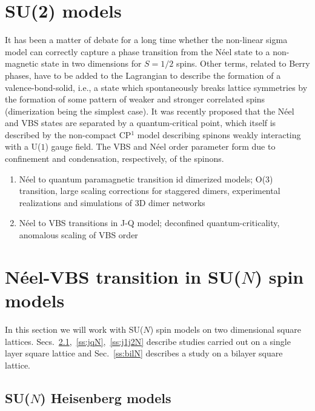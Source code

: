 \documentclass[aps,prb,groupedaddress,twocolumn]{revtex4}
\begin{document}
\section{SU(2) models}

It has been a matter of debate for a long time whether the non-linear sigma model can correctly capture a 
phase transition from the N\'eel state to a non-magnetic
state in two dimensions for $S=1/2$ spins. Other terms, related to Berry phases, have to be added to the Lagrangian
to describe the formation of a valence-bond-solid, i.e., a state which spontaneously breaks lattice symmetries 
by the formation of some pattern of weaker and stronger correlated spins (dimerization being the simplest case).
It was recently proposed that the N\'eel and VBS states are separated by a quantum-critical point, which itself
is described by the non-compact CP$^1$ model describing spinons weakly interacting with a U($1$) gauge field.
The VBS and N\'eel order parameter form due to confinement and condensation, respectively, of the spinons.


\begin{enumerate}
\item N\'eel to quantum paramagnetic transition id dimerized models; O(3) transition, large scaling
corrections for staggered dimers, experimental realizations and simulations of 3D dimer networks
\item N\'eel to VBS transitions in J-Q model; deconfined quantum-criticality, anomalous scaling of VBS order
\end{enumerate}

\section{N\'eel-VBS transition in SU($N$) spin models}

In this section we will work with SU($N$) spin models on two
dimensional  square
lattices. Secs.~\ref{ss:j1N},~\ref{ss:jqN},~\ref{ss:j1j2N} describe
studies carried out on a single layer square lattice and
Sec.~\ref{ss:bilN} describes a study on a bilayer square
lattice. 

\subsection{SU($N$) Heisenberg models}
\label{ss:j1N}
\end{document}
